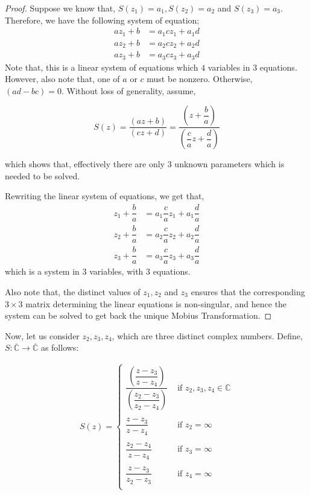 \documentclass[12pt]{article}
\newcommand{\C}{\mathbb{C}}
\newcommand{\Cinf}{\overline{\C}}
\theoremstyle{definition}
\begin{document}
\begin{proof}
    Suppose we know that, $S(z_1) = a_1, S(z_2) = a_2$ and $S(z_3) = a_3$. Therefore, we have the following system of equation;
    \begin{align*}
        az_1 + b & = a_1 cz_1 + a_1 d\\
        az_2 + b & = a_2 cz_2 + a_2 d\\
        az_3 + b & = a_3 cz_3 + a_3 d
    \end{align*}
    Note that, this is a linear system of equations which $4$ variables in $3$ equations. However, also note that, one of $a$ or $c$ must be nonzero. Otherwise, $(ad - bc) = 0$. Without loss of generality, assume,
    
    $$S(z) = \dfrac{(az + b)}{(cz + d)} = \dfrac{\left(z + \dfrac{b}{a} \right)}{\left(\dfrac{c}{a}z + \dfrac{d}{a}\right)}$$
    
    which shows that, effectively there are only $3$ unknown parameters which is needed to be solved.
    
    Rewriting the linear system of equations, we get that,
    \begin{align*}
        z_1 + \dfrac{b}{a} & = a_1 \dfrac{c}{a} z_1 + a_1 \dfrac{d}{a}\\
        z_2 + \dfrac{b}{a} & = a_2 \dfrac{c}{a} z_2 + a_2 \dfrac{d}{a}\\
        z_3 + \dfrac{b}{a} & = a_3 \dfrac{c}{a} z_3 + a_3 \dfrac{d}{a}
    \end{align*}
    which is a system in $3$ variables, with $3$ equations.
    
    Also note that, the distinct values of $z_1, z_2$ and $z_3$ ensures that the corresponding $3\times 3$ matrix determining the linear equations is non-singular, and hence the system can be solved to get back the unique Mobius Transformation.
\end{proof}

Now, let us consider $z_2, z_3, z_4$, which are three distinct complex numbers. Define, $S : \Cinf \rightarrow \Cinf$ as follows:

\begin{align*}
    S(z) = \begin{cases}
        \dfrac{\left( \dfrac{z - z_3}{z - z_4} \right)}{ \left( \dfrac{z_2 - z_3}{z_2 - z_4} \right) } & \text{ if } z_2, z_3, z_4 \in \C\\
        & \\
        \dfrac{z - z_3}{z - z_4} & \text{ if } z_2 = \infty\\
        & \\
        \dfrac{z_2 - z_4}{z - z_4} & \text{ if } z_3 = \infty\\
        & \\
        \dfrac{z - z_3}{z_2 - z_3} & \text{ if } z_4 = \infty\\
    \end{cases}
\end{align*}
\end{document}
